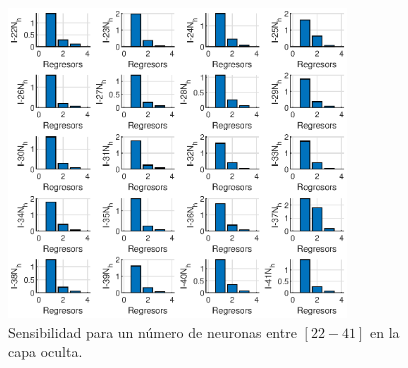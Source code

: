 \documentclass[12pt]{article}
\begin{document}
\begin{itemize}
\begin{figure}[t!]
		\includegraphics[width=0.8\textwidth]{imag/redes/sensibilidad_full_2_3.eps}
		\caption{Sensibilidad para un número de neuronas entre $[22-41]$ en la capa oculta.}
		\label{sensi_red_2_3}
	\end{figure}
\end{itemize}
\end{document}

